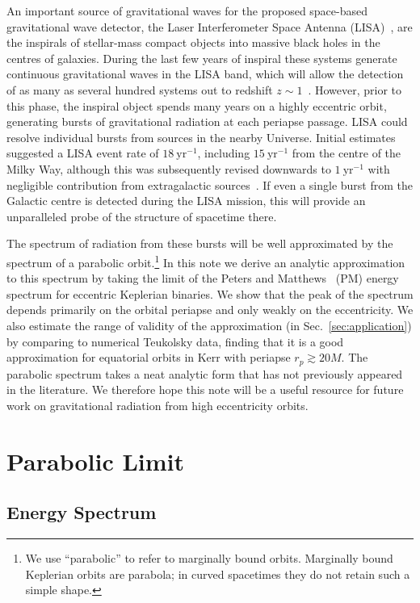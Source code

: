 \documentclass[aps,prd,amsfonts,amssymb,amsmath,nofootinbib,floatfix,reprint,showpacs,groupedaddress]{revtex4-1}
\newcommand{\secref}[1]{Sec.~\ref{sec:#1}}
\newcommand{\units}[1]{\ensuremath{~\mathrm{#1}}}
\begin{document}
An important source of gravitational waves for the proposed space-based gravitational wave detector, the Laser Interferometer Space Antenna (LISA)~\cite{Bender1998, Danzmann2003}, are the inspirals of stellar-mass compact objects into massive black holes in the centres of galaxies. During the last few years of inspiral these systems generate continuous gravitational waves in the LISA band, which will allow the detection of as many as several hundred systems out to redshift $z \sim 1$~\cite{Gair2009}. However, prior to this phase, the inspiral object spends many years on a highly eccentric orbit, generating bursts of gravitational radiation at each periapse passage. LISA could resolve individual bursts from sources in the nearby Universe. Initial estimates~\cite{Rubbo2006} suggested a LISA event rate of $18\units{yr^{-1}}$, including $15\units{yr^{-1}}$ from the centre of the Milky Way, although this was subsequently revised downwards to $1\units{yr^{-1}}$ with negligible contribution from extragalactic sources~\cite{Hopman2007}. If even a single burst from the Galactic centre is detected during the LISA mission, this will provide an unparalleled probe of the structure of spacetime there.

The spectrum of radiation from these bursts will be well approximated by the spectrum of a parabolic orbit.\footnote{We use ``parabolic'' to refer to marginally bound orbits. Marginally bound Keplerian orbits are parabola; in curved spacetimes they do not retain such a simple shape.} In this note we derive an analytic approximation to this spectrum by taking the limit of the Peters and Matthews~\cite{Peters1963, Peters1964} (PM) energy spectrum for eccentric Keplerian binaries. We show that the peak of the spectrum depends primarily on the orbital periapse and only weakly on the eccentricity. We also estimate the range of validity of the approximation (in \secref{application}) by comparing to numerical Teukolsky data, finding that it is a good approximation for equatorial orbits in Kerr with periapse $r_{p} \gtrsim 20M$. The parabolic spectrum takes a neat analytic form that has not previously appeared in the literature. We therefore hope this note will be a useful resource for future work on gravitational radiation from high eccentricity orbits.

\section{Parabolic Limit\label{sec:limit}}

\subsection{Energy Spectrum}
\end{document}
